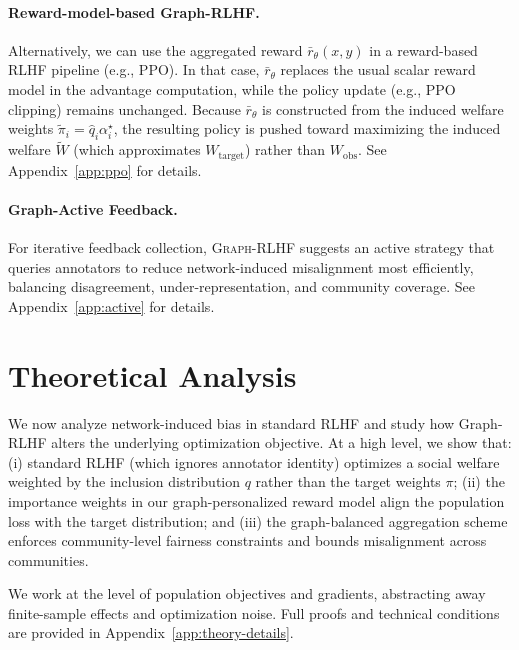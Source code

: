 \documentclass{article}
\theoremstyle{plain}
\theoremstyle{definition}
\theoremstyle{remark}
\begin{document}
\paragraph{Reward-model-based Graph-RLHF.}

Alternatively, we can use the aggregated reward $\bar r_\theta(x,y)$ in a
reward-based RLHF pipeline (e.g., PPO). In that case, $\bar r_\theta$ replaces
the usual scalar reward model in the advantage computation, while the policy
update (e.g., PPO clipping) remains unchanged. Because $\bar r_\theta$ is constructed from the induced welfare weights
$\tilde\pi_i = \hat q_i \alpha_i^\star$, the resulting policy is pushed
toward maximizing the induced welfare $\widetilde{W}$ (which approximates
$W_{\text{target}}$) rather than $W_{\text{obs}}$. See Appendix~\ref{app:ppo} for details.

\paragraph{Graph-Active Feedback.}
For iterative feedback collection, \textsc{Graph-RLHF} suggests an active strategy that queries annotators to reduce network-induced misalignment most efficiently, balancing disagreement, under-representation, and community coverage. See Appendix~\ref{app:active} for details.



\section{Theoretical Analysis}
\label{sec:theory}

We now analyze network-induced bias in standard RLHF and study how
Graph-RLHF alters the underlying optimization objective. At a high level, we
show that:
(i) standard RLHF (which ignores annotator identity) optimizes a social
welfare weighted by the inclusion distribution $q$ rather than the target
weights $\pi$;
(ii) the importance weights in our graph-personalized reward model align the
population loss with the target distribution; and
(iii) the graph-balanced aggregation scheme enforces community-level fairness
constraints and bounds misalignment across communities.

We work at the level of population objectives and gradients, abstracting away
finite-sample effects and optimization noise. Full proofs and technical
conditions are provided in Appendix~\ref{app:theory-details}.
\end{document}
